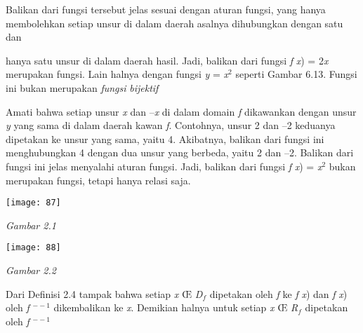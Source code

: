 \documentclass[11pt,fleqn]{book} %
\begin{document}
\begin{myEnumerate}
\begin{itemize}
Balikan dari fungsi tersebut jelas sesuai dengan aturan fungsi, yang hanya membolehkan setiap unsur di dalam daerah asalnya dihubungkan dengan satu dan 

hanya satu unsur di dalam daerah hasil. Jadi, balikan dari fungsi \textit{f} \textit{x}) = 2\textit{x} merupakan fungsi. Lain halnya dengan fungsi \textit{y} = \textit{x}${}^{2}$ seperti Gambar 6.13. Fungsi ini bukan merupakan \textit{fungsi} \textit{bijektif}

\noindent 

Amati bahwa setiap unsur \textit{x} dan --\textit{x} di dalam domain \textit{f }dikawankan dengan unsur\textit{ y }yang\textit{ }sama di dalam daerah\textit{ }kawan \textit{f}. Contohnya, unsur 2 dan --2 keduanya dipetakan ke unsur yang sama, yaitu 4. Akibatnya, balikan dari fungsi ini menghubungkan 4 dengan dua unsur yang berbeda, yaitu 2 dan --2. Balikan dari fungsi ini jelas menyalahi aturan fungsi. Jadi, balikan dari fungsi \textit{f} \textit{x}) = \textit{x}${}^{2}$ bukan merupakan fungsi, tetapi hanya relasi saja.



\noindent \textit{}

\begin{center}
\noindent \texttt{[image: 87]}
\end{center}

\noindent 

\noindent 

\noindent 

\noindent 

\noindent \textit{Gambar 2.1}

\noindent 

\noindent 

\noindent \textit{}

\begin{center}
\noindent \texttt{[image: 88]}
\end{center}

\noindent \textit{Gambar 2.2}

\noindent 

Dari Definisi 2.4 tampak bahwa setiap \textit{x} {\OE} \textit{D${}_{f}$} dipetakan oleh \textit{f} ke \textit{f} \textit{x}) dan \textit{f} \textit{x}) oleh \textit{f} ${}^{--1}$ dikembalikan ke \textit{x}. Demikian halnya untuk setiap \textit{x} {\OE} \textit{R${}_{f}$} dipetakan oleh \textit{f} ${}^{--1}$ 


\end{itemize}
\end{myEnumerate}
\end{document}
